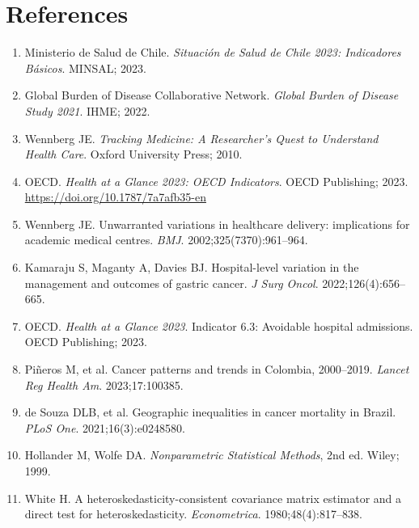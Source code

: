 \documentclass[10pt,twocolumn]{article}
\begin{document}
\section*{References}
\begin{enumerate}[leftmargin=16pt,label=\arabic*,itemsep=0pt,
    parsep=0pt,topsep=2pt,font=\small]

\item Ministerio de Salud de Chile. \textit{Situación de Salud de Chile 2023:
  Indicadores Básicos}. MINSAL; 2023.

\item Global Burden of Disease Collaborative Network. \textit{Global Burden of
  Disease Study 2021}. IHME; 2022.

\item Wennberg JE. \textit{Tracking Medicine: A Researcher's Quest to Understand
  Health Care}. Oxford University Press; 2010.

\item OECD. \textit{Health at a Glance 2023: OECD Indicators}. OECD Publishing; 2023.
  \url{https://doi.org/10.1787/7a7afb35-en}

\item Wennberg JE. Unwarranted variations in healthcare delivery: implications
  for academic medical centres. \textit{BMJ}. 2002;325(7370):961–964.

\item Kamaraju S, Maganty A, Davies BJ. Hospital-level variation in the management
  and outcomes of gastric cancer. \textit{J Surg Oncol}. 2022;126(4):656–665.

\item OECD. \textit{Health at a Glance 2023}. Indicator 6.3: Avoidable hospital
  admissions. OECD Publishing; 2023.

\item Piñeros M, et al. Cancer patterns and trends in Colombia, 2000–2019.
  \textit{Lancet Reg Health Am}. 2023;17:100385.

\item de Souza DLB, et al. Geographic inequalities in cancer mortality in Brazil.
  \textit{PLoS One}. 2021;16(3):e0248580.

\item Hollander M, Wolfe DA. \textit{Nonparametric Statistical Methods}, 2nd ed.
  Wiley; 1999.

\item White H. A heteroskedasticity-consistent covariance matrix estimator and a
  direct test for heteroskedasticity. \textit{Econometrica}. 1980;48(4):817–838.


\end{enumerate}
\end{document}
